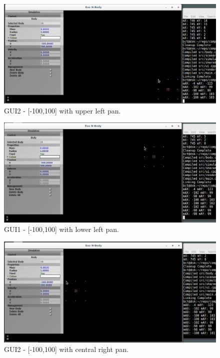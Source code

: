 \begin{figure}[H]
  \centering
  \includegraphics[width=\textwidth]{img/testingEvidence/gui2_0.png}
  \caption{GUI2 - [-100,100] with upper left pan.}
\end{figure}

\pagebreak

\begin{figure}[H]
  \centering
  \includegraphics[width=\textwidth]{img/testingEvidence/gui2_1.png}
  \caption{GUI1 - [-100,100] with lower left pan.}
\end{figure}

\begin{figure}[H]
  \centering
  \includegraphics[width=\textwidth]{img/testingEvidence/gui2_2.png}
  \caption{GUI2 - [-100,100] with central right pan.}
\end{figure}

